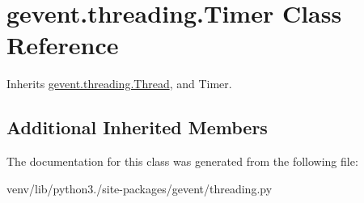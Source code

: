 \hypertarget{classgevent_1_1threading_1_1_timer}{}\section{gevent.\+threading.\+Timer Class Reference}
\label{classgevent_1_1threading_1_1_timer}


Inherits \hyperlink{classgevent_1_1threading_1_1_thread}{gevent.\+threading.\+Thread}, and Timer.

\subsection*{Additional Inherited Members}


The documentation for this class was generated from the following file\+:\begin{DoxyCompactItemize}
\item 
venv/lib/python3./site-\/packages/gevent/threading.\+py\end{DoxyCompactItemize}
